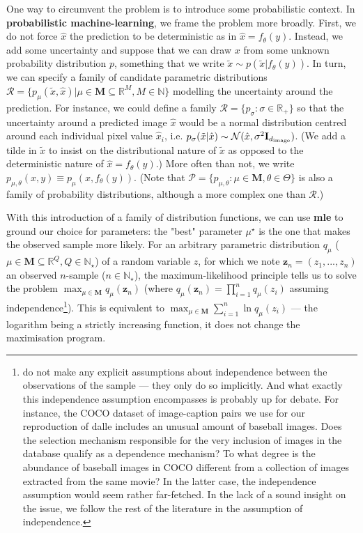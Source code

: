 \documentclass{article}
\begin{document}
\begin{multicols}{2}
One way to circumvent the problem is to introduce some probabilistic context. In \textbf{probabilistic machine-learning}, we frame the problem more broadly. First, we do not force $\hat x$ the prediction to be deterministic as in $\hat x=f_\theta(y)$. Instead, we add some uncertainty and suppose that we can draw $x$ from some unknown probability distribution $p$, something that we write $\tilde x \sim p(\tilde x|f_\theta(y))$. In turn, we can specify a family of candidate parametric distributions $\mathcal{R}=\{p_\mu(\tilde x, \hat x)|\mu \in \mathbf{M}\subseteq \mathbb{R}^M, M\in\mathbb{N}\}$ modelling the uncertainty around the prediction. For instance, we could define a family $\mathcal{R}=\{p_\sigma:\sigma \in \mathbb{R}_+\}$ so that the uncertainty around a predicted image $\hat x$ would be a normal distribution centred around each individual pixel value $\hat x_i$, i.e. $p_{\sigma}(\tilde x | \hat x)\sim 
\mathcal{N}(\hat x, \sigma^2 \mathbf{I}_{d_{\mathrm{image}}})$. (We add a tilde in $\tilde x$ to insist on the distributional nature of $\tilde x$ as opposed to the deterministic nature of $\hat x=f_\theta(y)$.) More often than not, we write $p_{\mu,\theta}(x,y)\equiv p_\mu(x, f_\theta(y))$. (Note that $\mathcal{P}=\{p_{\mu,\theta}:\mu \in\mathbf{M},\theta\in\Theta\}$ is also a family of probability distributions, although a more complex one than $\mathcal{R}$.)

With this introduction of a family of distribution functions, we can use \textbf{\gls{mle}} to ground our choice for parameters: the "best" parameter $\mu^\star$ is the one that makes the observed sample more likely. For an arbitrary parametric distribution $q_\mu$ ($\mu \in \mathbf{M} \subseteq \mathbb{R}^Q, Q \in \mathbb{N}_\star$) of a random variable $z$, for which we note $\mathbf{z}_n=(z_1, ..., z_n)$ an observed $n$-sample ($n \in \mathbb{N}_\star$), the maximum-likelihood principle tells us to solve the problem $\max_{\mu \in \mathbf{M}} q_\mu(\mathbf{z}_n)$ (where $q_\mu(\mathbf{z}_n)=\prod_{i=1}^nq_\mu(z_i)$ assuming independence\footnote{\citet{zeroshot} do not make any explicit assumptions about independence between the observations of the sample — they only do so implicitly. And what exactly this independence assumption encompasses is probably up for debate. For instance, the COCO dataset of image-caption pairs we use for our reproduction of \gls{dalle} includes an unusual amount of baseball images. Does the selection mechanism responsible for the very inclusion of images in the database qualify as a dependence mechanism? To what degree is the abundance of baseball images in COCO different from a collection of images extracted from the same movie? In the latter case, the independence assumption would seem rather far-fetched. In the lack of a sound insight on the issue, we follow the rest of the literature in the assumption of independence.}). This is equivalent to $\max_{\mu \in \mathbf{M}} \sum_{i=1}^n \ln q_\mu(z_i)$ — the logarithm being a strictly increasing function, it does not change the maximisation program.


\end{multicols}
\end{document}
